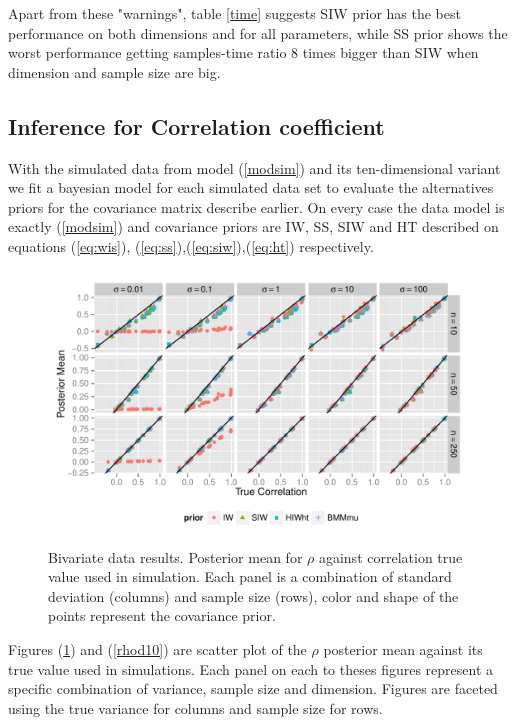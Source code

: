 \documentclass{article}
\begin{document}
Apart from these "warnings", table \ref{time} suggests  SIW prior has the best performance on both dimensions and for all parameters, while SS prior shows  the worst performance getting samples-time ratio 8 times bigger than SIW when dimension and sample size are big. 

%
%

\subsection{Inference for Correlation coefficient}

With the simulated data from model (\ref{modsim}) and its ten-dimensional variant we fit a bayesian model for each simulated data set to evaluate the alternatives priors for the covariance matrix describe earlier.  On every case the data model is exactly (\ref{modsim}) and covariance priors are IW, SS, SIW and HT described on equations (\ref{eq:wis}), (\ref{eq:ss}),(\ref{eq:siw}),(\ref{eq:ht}) respectively.   
\begin{figure}[hbtp]
   \centering
   \includegraphics[width=\textwidth] {fig_rho_d2} 
    \vspace{-.5in}
   \caption{Bivariate data results. Posterior mean for $\rho$  against correlation true value used in simulation. Each panel is a combination of standard deviation (columns) and sample size (rows),  color and shape of the points represent the covariance prior. \label{rhod2} }
\end{figure}

Figures (\ref{rhod2}) and (\ref{rhod10}) are scatter plot of the $\rho$ posterior mean against its true value used in simulations.  Each panel on each to theses figures represent a specific combination of variance, sample size and dimension.  Figures are faceted using the true variance for columns and sample size for rows. 
\end{document}
